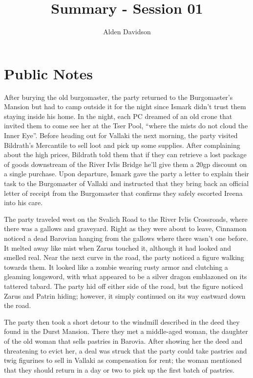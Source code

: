 \documentclass[a4paper,11pt]{article}
\title{Summary - Session 01}
\author{Alden Davidson}
\begin{document}
\maketitle


\section{Public Notes}
After burying the old burgomaster, the party returned to the Burgomaster's Mansion but had to camp outside it for
the night since Ismark didn't trust them staying inside his home. In the night, each PC dreamed of an old crone 
that invited them to come see her at the Tser Pool, ``where the mists do not cloud the Inner Eye''. Before 
heading out for Vallaki the next morning, the party visited Bildrath's Mercantile to sell loot and pick up some 
supplies. After complaining about the high prices, Bildrath told them that if they can retrieve a lost package of 
goods downstream of the River Ivlis Bridge he'll give them a 20gp discount on a single purchase. Upon departure, 
Ismark gave the party a letter to explain their task to the Burgomaster of Vallaki and instructed that they bring 
back an official letter of receipt from the Burgomaster that confirms they safely escorted Ireena into his care.

The party traveled west on the Svalich Road to the River Ivlis Crossroads, where there was a gallows and 
graveyard. Right as they were about to leave, Cinnamon noticed a dead Barovian hanging from the gallows where 
there wasn't one before. It melted away like mist when Zarus touched it, although it had looked and smelled 
real. Near the next curve in the road, the party noticed a figure walking towards them. It looked like a zombie 
wearing rusty armor and clutching a gleaming longsword, with what appeared to be a silver dragon emblazoned on 
its tattered tabard. The party hid off either side of the road, but the figure noticed Zarus and Patrin hiding; 
however, it simply continued on its way eastward down the road.

The party then took a short detour to the windmill described in the deed they found in the Durst Mansion. There 
they met a middle-aged woman, the daughter of the old woman that sells pastries in Barovia. After showing her the 
deed and threatening to evict her, a deal was struck that the party could take pastries and twig figurines to 
sell in Vallaki as compensation for rent; the woman mentioned that they should return in a day or two to pick up 
the first batch of pastries.
\end{document}
